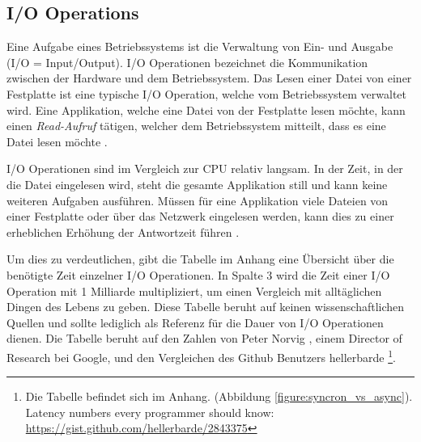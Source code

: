 \subsection{I/O Operations}
\label{subsection: io_operationen}

Eine Aufgabe eines Betriebssystems ist die Verwaltung von Ein- und Ausgabe (I/O = Input/Output). I/O Operationen bezeichnet die Kommunikation zwischen der Hardware und dem Betriebssystem. Das Lesen einer Datei von einer Festplatte ist eine typische I/O Operation, welche vom Betriebssystem verwaltet wird. Eine Applikation, welche eine Datei von der Festplatte lesen möchte, kann einen \emph{Read-Aufruf} tätigen, welcher dem Betriebssystem mitteilt, dass es eine Datei lesen möchte \cite[p. 292]{tan09}.

I/O Operationen sind im Vergleich zur CPU relativ langsam. In der Zeit, in der die Datei eingelesen wird, steht die gesamte Applikation still und kann keine weiteren Aufgaben ausführen. Müssen für eine Applikation viele Dateien von einer Festplatte oder über das Netzwerk eingelesen werden, kann dies zu einer erheblichen Erhöhung der Antwortzeit führen \cite[p. 307]{tan09}. 

Um dies zu verdeutlichen, gibt die Tabelle im Anhang eine Übersicht über die benötigte Zeit einzelner I/O Operationen. In Spalte 3 wird die Zeit einer I/O Operation mit 1 Milliarde multipliziert, um einen Vergleich mit alltäglichen Dingen des Lebens zu geben. Diese Tabelle beruht auf keinen wissenschaftlichen Quellen und sollte lediglich als Referenz für die Dauer von I/O Operationen dienen. Die Tabelle beruht auf den Zahlen von Peter Norvig \cite[]{Nor98}, einem Director of Research bei Google, und den Vergleichen des Github Benutzers hellerbarde \footnote{Die Tabelle befindet sich im Anhang. (Abbildung \ref{figure:syncron_vs_async}). Latency numbers every programmer should know: \url{https://gist.github.com/hellerbarde/2843375}}.